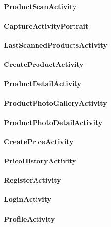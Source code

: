 \documentclass{scrartcl}
\begin{document}
\paragraph{ProductScanActivity}

\paragraph{CaptureActivityPortrait}

\paragraph{LastScannedProductsActivity}

\paragraph{CreateProductActivity}

\paragraph{ProductDetailActivity}

\paragraph{ProductPhotoGalleryActivity}

\paragraph{ProductPhotoDetailActivity}

\paragraph{CreatePriceActivity}

\paragraph{PriceHistoryActivity}

\paragraph{RegisterActivity}

\paragraph{LoginActivity}

\paragraph{ProfileActivity}
\end{document}
